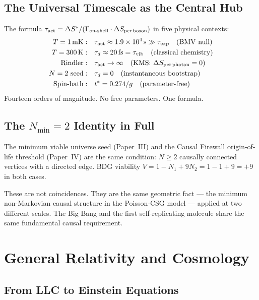 \documentclass[12pt,a4paper]{article}
\begin{document}
\subsection{The Universal Timescale as the Central Hub}

The formula $\tau_{\rm act}=\Delta S^*/(\Gamma_{\rm on\text{-}shell}\cdot\Delta S_{\rm per\,boson})$ in five physical contexts:
\begin{align}
  T=1\,\mathrm{mK}:& \quad\tau_{\rm act}\approx1.9\times10^4\,\mathrm{s} \gg \tau_{\rm exp} \quad\text{(BMV null)} \\
  T=300\,\mathrm{K}:& \quad\tau_d\approx20\,\mathrm{fs}=\tau_{\rm vib} \quad\text{(classical chemistry)} \\
  \text{Rindler}:& \quad\tau_{\rm act}\to\infty \quad\text{(KMS: $\Delta S_{\rm per\,photon}=0$)} \\
  N=2\text{ seed}:& \quad\tau_d=0 \quad\text{(instantaneous bootstrap)} \\
  \text{Spin-bath}:& \quad t^*=0.274/g \quad\text{(parameter-free)}
\end{align}
Fourteen orders of magnitude.  No free parameters.  One formula.

\subsection{The $N_{\min}=2$ Identity in Full}

The minimum viable universe seed (Paper~III) and the Causal Firewall origin-of-life threshold (Paper~IV) are the same condition: $N\geq2$ causally connected vertices with a directed edge.  BDG viability $V=1-N_1+9N_2=1-1+9=+9$ in both cases.

These are not coincidences.  They are the same geometric fact --- the minimum non-Markovian causal structure in the Poisson-CSG model --- applied at two different scales.  The Big Bang and the first self-replicating molecule share the same fundamental causal requirement.

\section{General Relativity and Cosmology}\label{sec:gr}

\subsection{From LLC to Einstein Equations}
\end{document}

